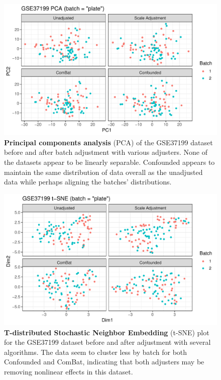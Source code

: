 \documentclass[notitlepage]{article}
\begin{document}
\begin{figure}
	\centering
	\includegraphics[width=\columnwidth]{figures/final/pca.pdf}
	\caption{\textbf{Principal components analysis} (PCA) of the GSE37199 dataset before and after batch adjustment with various adjusters.
	None of the datasets appear to be linearly separable.
	Confounded appears to maintain the same distribution of data overall as the unadjusted data while perhaps aligning the batches' distributions.}
	\label{fig:pca}
\end{figure}
\begin{figure}
	\centering
	\includegraphics[width=\columnwidth]{figures/final/tsne.pdf}
	\caption{\textbf{T-distributed Stochastic Neighbor Embedding} (t-SNE) plot for the GSE37199 dataset before and after adjustment with several algorithms.
	The data seem to cluster less by batch for both Confounded and ComBat, indicating that both adjusters may be removing nonlinear effects in this dataset.}
	\label{fig:tsne}
\end{figure}
\end{document}
